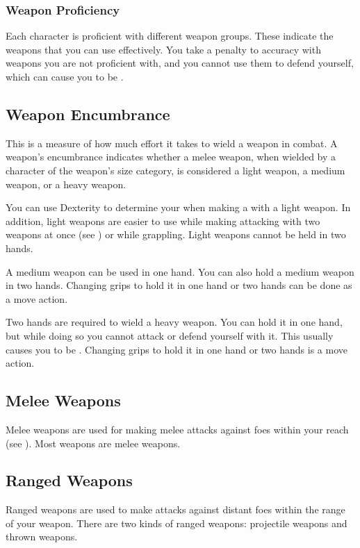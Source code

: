         \subsubsection{Weapon Proficiency}\label{Weapon Proficiency}
            Each character is proficient with different weapon groups. These indicate the weapons that you can use effectively. You take a  penalty to accuracy with weapons you are not proficient with, and you cannot use them to defend yourself, which can cause you to be .

    \subsection{Weapon Encumbrance}\label{Weapon Encumbrance}
        This is a measure of how much effort it takes to wield a weapon in combat. A weapon's encumbrance indicates whether a melee weapon, when wielded by a character of the weapon's size category, is considered a light weapon, a medium weapon, or a heavy weapon.

        \label{Light Weapons} You can use Dexterity to determine your  when making a  with a light weapon.
        In addition, light weapons are easier to use while making attacking with two weapons at once (see ) or while grappling.
        Light weapons cannot be held in two hands.

         A medium weapon can be used in one hand. You can also hold a medium weapon in two hands. Changing grips to hold it in one hand or two hands can be done as a move action.

         Two hands are required to wield a heavy weapon. You can hold it in one hand, but while doing so you cannot attack or defend yourself with it. This usually causes you to be . Changing grips to hold it in one hand or two hands is a move action.


    \subsection{Melee Weapons}
        Melee weapons are used for making melee attacks against foes within your reach (see ). Most weapons are melee weapons.

    \subsection{Ranged Weapons}
        Ranged weapons are used to make attacks against distant foes within the range of your weapon. There are two kinds of ranged weapons: projectile weapons and thrown weapons.

